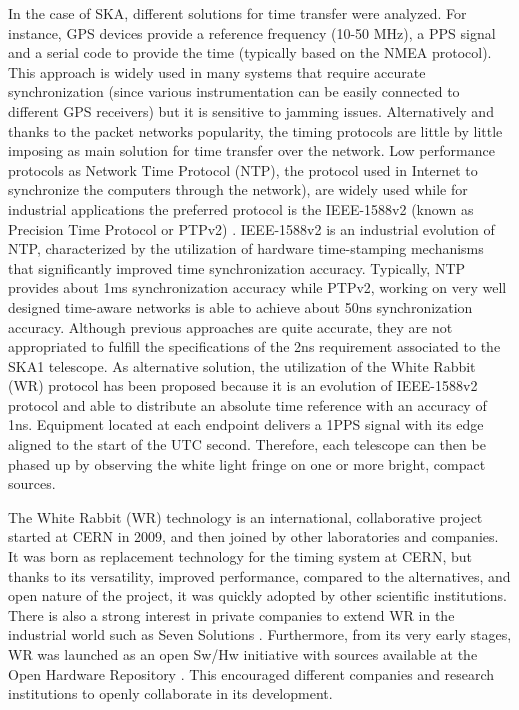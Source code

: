 In the case of SKA, different solutions for time transfer were analyzed. For instance, GPS devices provide a reference frequency (10-50 MHz), a PPS signal and a serial code to provide the time (typically based on the NMEA protocol). This approach is widely used in many systems that require accurate synchronization (since various instrumentation can be easily connected to different GPS receivers) but it is sensitive to jamming issues. Alternatively and thanks to the packet networks popularity, the timing protocols are little by little imposing as main solution for time transfer over the network. Low performance protocols as Network Time Protocol (NTP), the protocol used in Internet to synchronize the computers through the network), \cite{ntf:ntp_std} are widely used while for industrial applications the preferred protocol is the IEEE-1588v2 (known as Precision Time Protocol or PTPv2) \cite{ieee:ieee1588_std} \cite{itu:TG8275_1_Y_1369_1}. IEEE-1588v2 is an industrial evolution of NTP, characterized by the utilization of hardware time-stamping mechanisms that significantly improved time synchronization accuracy. Typically, NTP provides about 1ms synchronization accuracy while PTPv2, working on very well designed time-aware networks is able to achieve about 50ns synchronization accuracy. 
Although previous approaches are quite accurate, they are not appropriated to fulfill the specifications of the 2ns requirement associated to the SKA1 telescope. As alternative solution, the utilization of the White Rabbit (WR) protocol has been proposed because it is an evolution of IEEE-1588v2 protocol and able to distribute an absolute time reference with an accuracy of 1ns. Equipment located at each endpoint delivers a 1PPS signal with its edge aligned to the start of the UTC second. Therefore, each telescope can then be phased up by observing the white light fringe on one or more bright, compact sources.

The White Rabbit (WR) technology is an international, collaborative project started at CERN in 2009, and then joined by other laboratories and companies. It was born as replacement technology for the timing system at CERN, but thanks to its versatility, improved performance, compared to the alternatives, and open nature of the project, it was quickly adopted by other scientific institutions. There is also a strong interest in private companies to extend WR in the industrial world such as Seven Solutions \cite{sevensols:wr}. Furthermore, from its very early stages, WR was launched as an open Sw/Hw initiative with sources available at the Open Hardware Repository \cite{ohwr:repo}. This encouraged different companies and research institutions to openly collaborate in its development.

